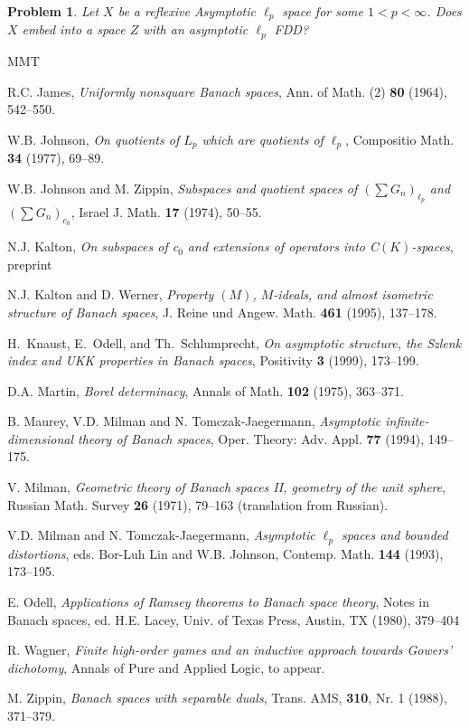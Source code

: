 \documentclass[11pt,leqno]{amsart}
\newtheorem{prob}[thm]{Problem}
\theoremstyle{definition}
\begin{document}
\begin{prob}\label{prob:5.4}
Let $X$ be a reflexive Asymptotic $\ell_p$ space for some $1<p<\infty$. 
Does $X$ embed into a space $Z$ with an asymptotic $\ell_p$ FDD?
\end{prob}

\begin{thebibliography}{MMT}

R.C. James, 
{\em Uniformly nonsquare Banach spaces},
Ann. of Math. (2){ \bf 80} (1964), 542--550.

W.B. Johnson,
{\em On quotients of $L_p$ which are quotients of $\ell_p$},  
Compositio Math. {\bf 34} (1977),  69--89. 

W.B. Johnson and M. Zippin, 
{\em Subspaces and quotient spaces of $(\sum G_n)_{\ell_p}$ and 
$(\sum G_n)_{c_0}$}, 
Israel J. Math. {\bf 17} (1974), 50--55. 

N.J. Kalton,  
{\em On subspaces of c$_0$ and extensions of operators into
C$(K)$-spaces}, preprint

N.J. Kalton and D. Werner, 
{\em Property $(M)$, $M$-ideals, and almost isometric structure 
of Banach spaces}, 
J. Reine und Angew. Math. {\bf 461} (1995), 137--178.

H.~Knaust, E.~Odell, and Th.~Schlumprecht, 
{\em On asymptotic structure, the Szlenk index and UKK properties in 
Banach spaces},
Positivity {\bf3} (1999), 173--199.

D.A. Martin,  
{\em Borel determinacy}, 
Annals of Math. {\bf 102}  (1975),  363--371. 
 
B. Maurey, V.D. Milman and N. Tomczak-Jaegermann, 
{\em Asymptotic infinite-dimensional theory of Banach spaces}, 
Oper. Theory: Adv. Appl. {\bf 77} (1994), 149--175. 
 
V. Milman, 
{\em Geometric theory of Banach spaces II, geometry of the unit sphere}, 
Russian Math. Survey {\bf 26} (1971), 79--163 
(translation from Russian).

 
V.D. Milman and N. Tomczak-Jaegermann, 
{\em Asymptotic $\ell_p$ spaces and bounded distortions},
eds. Bor-Luh Lin and W.B. Johnson,
Contemp. Math. {\bf 144} (1993), 173--195.

E. Odell, 
{\em Applications of Ramsey theorems to Banach space theory}, 
Notes in Banach spaces, 
ed. H.E. Lacey, 
Univ. of Texas Press, 
Austin, TX 
(1980), 
379--404 

R. Wagner,
{\em Finite high-order games and an inductive approach towards Gowers' 
dichotomy}, 
Annals of Pure and Applied Logic, to appear. 

M. Zippin, 
{\em Banach spaces with separable duals}, 
Trans. AMS, {\bf 310}, Nr. 1 (1988), 371--379.




\end{thebibliography}
   
 
\end{document}
